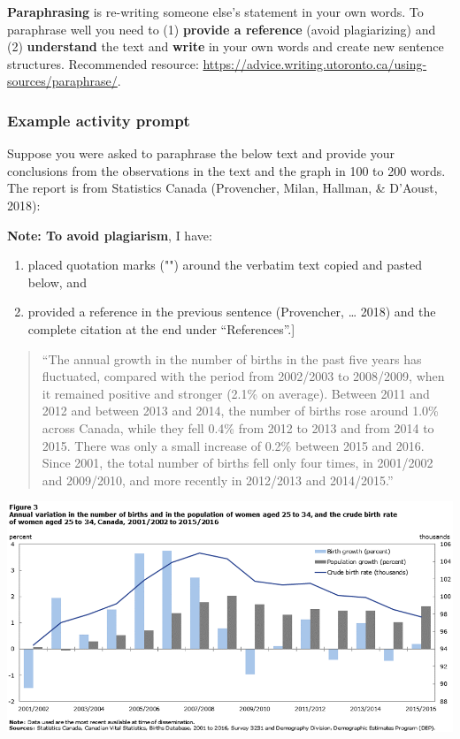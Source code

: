 \documentclass[
  openany]{book}
\begin{document}
\textbf{Paraphrasing} is re-writing someone else's statement in your own words. To paraphrase well you need to (1) \textbf{provide a reference} (avoid plagiarizing) and (2) \textbf{understand} the text and \textbf{write} in your own words and create new sentence structures. Recommended resource: \url{https://advice.writing.utoronto.ca/using-sources/paraphrase/}.

\hypertarget{example-activity-prompt}{%
\subsubsection{Example activity prompt}\label{example-activity-prompt}}

Suppose you were asked to paraphrase the below text and provide your conclusions from the observations in the text and the graph in 100 to 200 words. The report is from Statistics Canada (Provencher, Milan, Hallman, \& D'Aoust, 2018):

\textbf{Note: To avoid plagiarism}, I have:

\begin{enumerate}
\def\labelenumi{(\arabic{enumi})}
\item
  placed quotation marks ("") around the verbatim text copied and pasted below, and
\item
  provided a reference in the previous sentence (Provencher, \ldots{} 2018) and the complete citation at the end under ``References''.{]}
\end{enumerate}

\begin{quote}
``The annual growth in the number of births in the past five years has fluctuated, compared with the period from 2002/2003 to 2008/2009, when it remained positive and stronger (2.1\% on average). Between 2011 and 2012 and between 2013 and 2014, the number of births rose around 1.0\% across Canada, while they fell 0.4\% from 2012 to 2013 and from 2014 to 2015. There was only a small increase of 0.2\% between 2015 and 2016. Since 2001, the total number of births fell only four times, in 2001/2002 and 2009/2010, and more recently in 2012/2013 and 2014/2015.''
\end{quote}

\begin{center}\includegraphics[width=1\linewidth]{images/m2/paraphrase} \end{center}
\end{document}
